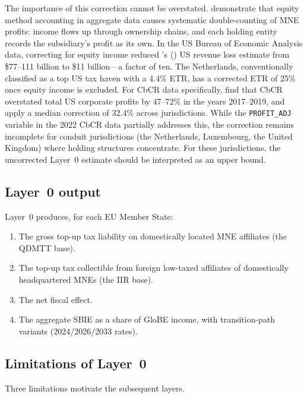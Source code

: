 \documentclass[11pt,a4paper]{article}
\newcommand{\code}[1]{\texttt{#1}}
\begin{document}
The importance of this correction cannot be overstated. \citet{blouin2023} demonstrate that equity method accounting in aggregate data causes systematic double-counting of MNE profits: income flows up through ownership chains, and each holding entity records the subsidiary's profit as its own. In the US Bureau of Economic Analysis data, correcting for equity income reduced \citeauthor{clausing2016}'s (\citeyear{clausing2016}) US revenue loss estimate from \$77--111 billion to \$11 billion---a factor of ten. The Netherlands, conventionally classified as a top US tax haven with a 4.4\% ETR, has a corrected ETR of 25\% once equity income is excluded. For CbCR data specifically, \citet{garcia2022} find that CbCR overstated total US corporate profits by 47--72\% in the years 2017--2019, and \citet{hugger2025} apply a median correction of 32.4\% across jurisdictions. While the \code{PROFIT\_ADJ} variable in the 2022 CbCR data partially addresses this, the correction remains incomplete for conduit jurisdictions (the Netherlands, Luxembourg, the United Kingdom) where holding structures concentrate. For these jurisdictions, the uncorrected Layer~0 estimate should be interpreted as an upper bound.

\subsection{Layer~0 output}\label{sec:layer0_output}

Layer~0 produces, for each EU Member State:
\begin{enumerate}
\item The gross top-up tax liability on domestically located MNE affiliates (the QDMTT base).
\item The top-up tax collectible from foreign low-taxed affiliates of domestically headquartered MNEs (the IIR base).
\item The net fiscal effect.
\item The aggregate SBIE as a share of GloBE income, with transition-path variants (2024/2026/2033 rates).
\end{enumerate}

\subsection{Limitations of Layer~0}\label{sec:layer0_limits}

Three limitations motivate the subsequent layers.
\end{document}
